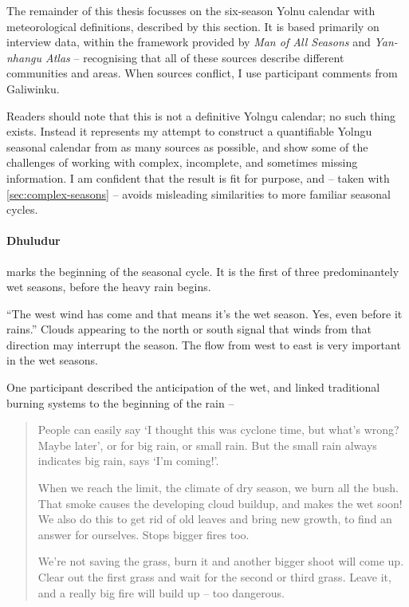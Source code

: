 The remainder of this thesis focusses on the six-season Yolnu calendar with
meteorological definitions, described by this section.
It is based primarily on interview data, within
the framework provided by \textit{Man of All Seasons} \citep{davis1989} and
\textit{Yan-nhangu Atlas} \citep[][p36]{atlas2014} -- recognising that all of these
sources describe different communities and areas.  When sources conflict, I
use participant comments from Galiwinku.

Readers should note that this is not a definitive Yolngu calendar; no such
thing exists.  Instead it represents my attempt to construct a quantifiable
Yolngu seasonal calendar from as many sources as possible, and show some of
the challenges of working with complex, incomplete, and sometimes missing
information.  I am confident that the result is fit for purpose, and -- taken
with \cref{sec:complex-seasons} -- avoids misleading similarities to
more familiar seasonal cycles.


\paragraph{Dhuludur} marks the beginning of the seasonal cycle.  It is the
first of three predominantely wet seasons, before the heavy rain begins.

``The west wind has come and that means it's the wet season.  Yes, even
before it rains.''  Clouds appearing to the north or south signal that
winds from that direction may interrupt the season.   The flow from west
to east is very important in the wet seasons.

One participant described the anticipation of the wet, and linked traditional
burning systems to the beginning of the rain --
\begin{quote}
    People can easily say `I thought this was cyclone time, but what's wrong?
    Maybe later', or for big rain, or small rain.  But the small rain always
    indicates big rain, says `I'm coming!'.

    When we reach the limit, the climate of dry season, we burn all the bush.
    That smoke causes the developing cloud buildup, and makes the wet soon!
    We also do this to get rid of old leaves and bring new growth,
    to find an answer for ourselves.  Stops bigger fires too.

    We're not saving the grass, burn it and another bigger shoot will come up.
    Clear out the first grass and wait for the second or third grass.
    Leave it, and a really big fire will build up -- too dangerous.
\end{quote}

